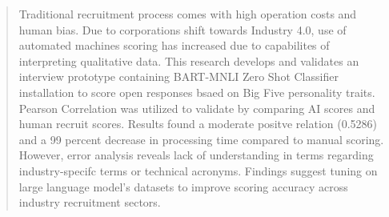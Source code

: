 \begin{abstract}
Traditional recruitment process comes with high operation costs and human bias. Due to corporations shift towards Industry 4.0, use of automated machines scoring has increased due to capabilites of interpreting qualitative data. This research develops and validates an interview prototype containing BART-MNLI Zero Shot Classifier installation to score open responses bsaed on Big Five personality traits. Pearson Correlation was utilized to validate by comparing AI scores and human recruit scores. Results found a moderate positve relation (0.5286) and a 99 percent decrease in processing time compared to manual scoring. However, error analysis reveals lack of understanding in terms regarding industry-specifc terms or technical acronyms. Findings suggest tuning on large language model's datasets to improve scoring accuracy across industry recruitment sectors.  
\end{abstract}